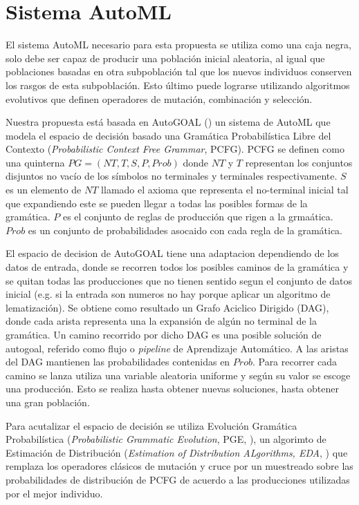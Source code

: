 \section{Sistema AutoML}
El sistema AutoML necesario para esta propuesta se utiliza como una caja negra, solo debe ser capaz de producir una poblaci\'on inicial aleatoria, al igual que poblaciones basadas en otra subpoblaci\'on tal que los nuevos individuos conserven los rasgos de esta subpoblaci\'on. Esto \'ultimo puede lograrse utilizando algoritmos evolutivos que definen operadores de mutaci\'on, combinaci\'on y selecci\'on.

Nuestra propuesta est\'a basada en AutoGOAL (\cite{estevez2020solving}) un sistema de AutoML que modela el espacio de decisi\'on basado una Gram\'atica Probabil\'istica  Libre del Contexto (\textit{Probabilistic Context Free Grammar}, PCFG). PCFG se definen como una quinterna $PG = (NT, T, S, P, Prob)$ donde $NT$ y $T$ representan los conjuntos disjuntos no vac\'io de los s\'imbolos no terminales y terminales respectivamente. $S$ es un elemento de $NT$ llamado el axioma que representa el no-terminal inicial tal que expandiendo este se pueden llegar a todas las posibles formas de la gram\'atica. $P$ es el conjunto de reglas de producci\'on que rigen a la grma\'atica. $Prob$  es un conjunto de probabilidades asocaido con cada regla de la gram\'atica. 

El espacio de decision de AutoGOAL tiene una adaptacion dependiendo de los datos de entrada, donde se recorren todos los posibles caminos de la gram\'atica y se quitan todas las producciones que no tienen sentido segun el conjunto de datos inicial (e.g. si la entrada son numeros no hay porque aplicar un algoritmo de lematizaci\'on). Se obtiene como resultado un Grafo Aciclico Dirigido (DAG), donde cada arista representa una la expansi\'on de alg\'un no terminal de la gram\'atica. Un camino recorrido por dicho DAG es una posible soluci\'on de autogoal, referido como flujo o \textit{pipeline} de Aprendizaje Autom\'atico. A las aristas del DAG mantienen las probabilidades contenidas en $Prob$. Para recorrer cada camino se lanza utiliza una variable aleatoria uniforme y seg\'un su valor se escoge una producci\'on. Esto se realiza hasta obtener nuevas soluciones, hasta obtener una gran poblaci\'on.


Para acutalizar el espacio de decisi\'on  se utiliza Evoluci\'on Gram\'atica Probabil\'istica (\textit{Probabilistic Grammatic Evolution}, PGE, \cite{megane2021probabilistic}), un algorimto de Estimaci\'on de Distribuci\'on (\textit{Estimation of Distribution ALgorithms, EDA}, \cite{larranaga2001estimation}) que remplaza los operadores cl\'asicos de mutaci\'on y cruce por un muestreado sobre las probabilidades de distribuci\'on de PCFG de acuerdo a las producciones utilizadas por el mejor individuo. 

